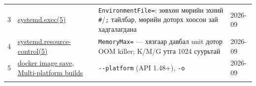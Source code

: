 \begin{longtable}[]{@{}llll@{}}
\begin{minipage}[t]{0.22\columnwidth}\raggedright
3\strut
\end{minipage} & \begin{minipage}[t]{0.22\columnwidth}\raggedright
\href{https://man7.org/linux/man-pages/man5/systemd.exec.5.html}{systemd.exec(5)}\strut
\end{minipage} & \begin{minipage}[t]{0.22\columnwidth}\raggedright
\texttt{EnvironmentFile=}: зөвхөн мөрийн эхний \texttt{\#}/\allowbreak\texttt{;} тайлбар, мөрийн доторх хоосон зай хадгалагдана\strut
\end{minipage} & \begin{minipage}[t]{0.22\columnwidth}\raggedright
2026-09\strut
\end{minipage}\tabularnewline
\begin{minipage}[t]{0.22\columnwidth}\raggedright
4\strut
\end{minipage} & \begin{minipage}[t]{0.22\columnwidth}\raggedright
\href{https://man7.org/linux/man-pages/man5/systemd.resource-control.5.html}{systemd.\allowbreak{}resource-control(5)}\strut
\end{minipage} & \begin{minipage}[t]{0.22\columnwidth}\raggedright
\texttt{MemoryMax=} --- хязгаар давбал unit дотор OOM killer; K/M/G утга 1024 суурьтай\strut
\end{minipage} & \begin{minipage}[t]{0.22\columnwidth}\raggedright
2026-09\strut
\end{minipage}\tabularnewline
\begin{minipage}[t]{0.22\columnwidth}\raggedright
5\strut
\end{minipage} & \begin{minipage}[t]{0.22\columnwidth}\raggedright
\href{https://docs.docker.com/reference/cli/docker/image/save/}{docker image save}, \href{https://docs.docker.com/build/building/multi-platform/}{Multi-platform builds}\strut
\end{minipage} & \begin{minipage}[t]{0.22\columnwidth}\raggedright
\texttt{-\/-platform} (API 1.48+), \texttt{-o}\strut
\end{minipage} & \begin{minipage}[t]{0.22\columnwidth}\raggedright
2026-09\strut
\end{minipage}\tabularnewline
\begin{minipage}[t]{0.22\columnwidth}\raggedright

\end{minipage}
\end{longtable}
